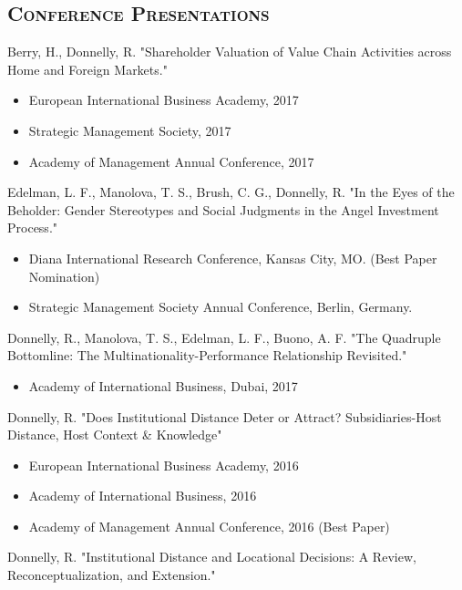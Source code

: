 \documentclass[margin, 12pt]{res}
\begin{document}
\begin{resume}
\section{\normalfont\textsc{Conference Presentations}}
Berry, H., Donnelly, R. "Shareholder Valuation of Value Chain Activities across Home and Foreign Markets." 
\begin{itemize}
\item European International Business Academy, 2017
\item Strategic Management Society, 2017
\item Academy of Management Annual Conference, 2017
\end{itemize}
\vspace{-0.25cm}
Edelman, L. F., Manolova, T. S., Brush, C. G., Donnelly, R.  "In the Eyes of the Beholder: Gender Stereotypes and Social Judgments in the Angel Investment Process." 
\begin{itemize}

\item  Diana International Research Conference, Kansas City, MO. (Best Paper Nomination)
\item Strategic Management Society Annual Conference, Berlin, Germany. 
\end{itemize}

\vspace{-0.25cm}

Donnelly, R., Manolova, T. S., Edelman, L. F., Buono, A. F. "The Quadruple Bottomline: The Multinationality-Performance Relationship Revisited." 
\begin{itemize}
\item Academy of International Business, Dubai, 2017
\end{itemize}

\vspace{-0.25cm}
Donnelly, R. "Does Institutional Distance Deter or Attract? Subsidiaries-Host Distance, Host Context \& Knowledge" 
\begin{itemize}
\item European International Business Academy, 2016
\item Academy of International Business, 2016
\item Academy of Management Annual Conference, 2016 (Best Paper)
\end{itemize}
\vspace{-0.25cm}
Donnelly, R. "Institutional Distance and Locational Decisions: A Review, Reconceptualization, and Extension." 



\end{resume}
\end{document}
